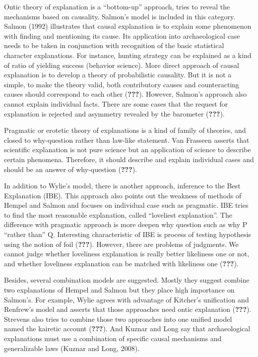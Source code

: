 \documentclass[american,man]{apa6}
\begin{document}
Ontic theory of explanation is a \enquote{bottom-up} approach, tries to
reveal the mechanisms based on causality. Salmon's model is included in
this category. Salmon (1992) illustrates that causal explanation is to
explain some phenomenon with finding and mentioning its cause. Its
application into archaeological case needs to be taken in conjunction
with recognition of the basic statistical character explanations. For
instance, hunting strategy can be explained as a kind of ratio of
yielding success (behavior science). More direct approach of causal
explanation is to develop a theory of probabilistic causality. But it is
not a simple, to make the theory valid, both contributory causes and
counteracting causes should correspond to each other ({\textbf{???}}).
However, Salmon's approach also cannot explain individual facts. There
are some cases that the request for explanation is rejected and
asymmetry revealed by the barometer ({\textbf{???}}).

Pragmatic or erotetic theory of explanations is a kind of family of
theories, and closed to why-question rather than law-like statement. Van
Frasseen asserts that scientific explanation is not pure science but an
application of science to describe certain phenomena. Therefore, it
should describe and explain individual cases and should be an answer of
why-question ({\textbf{???}}).

In addition to Wylie's model, there is another approach, inference to
the Best Explanation (IBE). This approach also points out the weakness
of methods of Hempel and Salmon and focuses on individual case such as
pragmatic. IBE tries to find the most reasonable explanation, called
\enquote{loveliest explanation}. The difference with pragmatic approach
is more deepen why question such as why P \enquote{rather than} Q.
Interesting characteristic of IBE is process of testing hypothesis using
the notion of foil ({\textbf{???}}). However, there are problems of
judgments. We cannot judge whether loveliness explanation is really
better likeliness one or not, and whether loveliness explanation can be
matched with likeliness one ({\textbf{???}}).

Besides, several combination models are suggested. Mostly they suggest
combine two explanations of Hempel and Salmon but they place high
importance on Salmon's. For example, Wylie agrees with advantage of
Kitcher's unification and Renfrew's model and asserts that those
approaches need ontic explanation ({\textbf{???}}). Strevens also tries
to combine those two approaches into one unified model named the
kairetic account ({\textbf{???}}). And Kuznar and Long say that
archaeological explanations must use a combination of specific causal
mechanisms and generalizable laws (Kuznar and Long, 2008).
\end{document}
